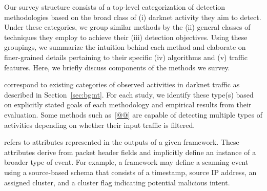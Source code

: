 \documentclass[manuscript,nonacm]{acmart}
\begin{document}
Our survey structure consists of a top-level categorization of detection methodologies based on the broad class of (i) darknet activity they aim to detect.
Under these categories, we group similar methods by the (ii) general classes of techniques they employ to achieve their (iii) detection objectives.
Using these groupings, we summarize the intuition behind each method and elaborate on finer-grained details pertaining to their specific (iv) algorithms and (v) traffic features.
Here, we briefly discuss components of the methods we survey.



\vspace{0.25em}
 correspond to existing categories of observed activities in darknet traffic as described in Section~\ref{sec:bg:nt}. 
For each study, we identify these type(s) based on explicitly stated goals of each methodology and empirical results from their evaluation. 
Some methods such as~\ref{@@} are capable of detecting multiple types of activities depending on whether their input traffic is filtered.


\vspace{0.25em}
 refers to attributes represented in the outputs of a given framework.
These attributes derive from packet header fields and implicitly define an instance of a broader type of event.
For example, a framework may define a scanning event using a source-based schema that consists of a timestamp, source IP address, an assigned cluster, and a cluster flag indicating potential malicious intent.
\end{document}
